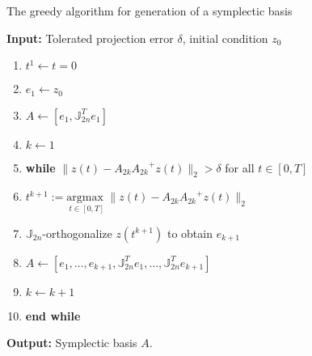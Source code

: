 \begin{algorithm} 
\caption{The greedy algorithm for generation of a symplectic basis} \label{alg:added1}
{\bf Input:} Tolerated projection error $\delta$, initial condition $ z_0$
\begin{enumerate}
\item $t^1 \leftarrow t=0$
\item $e_1 \leftarrow z_0$
\item $A \leftarrow [e_1,\mathbb J^T_{2n}e_1]$
\item $k \leftarrow 1$
\item \textbf{while} $\| z(t) - A_{2k}{A_{2k}}^+z(t) \|_2 > \delta$ for all $t \in [0,T]$
\item \hspace{0.5cm} $t^{k+1} := \underset{t\in [0,T]}{\text{argmax }} \| z(t) - A_{2k}{A_{2k}}^+z(t) \|_2$
\item \hspace{0.5cm} $\mathbb J_{2n}$-orthogonalize $ z(t^{k+1})$ to obtain $e_{k+1}$
\item \hspace{0.5cm} $A \leftarrow [e_1,\dots ,e_{k+1} , \mathbb J^T_{2n}e_1,\dots,\mathbb J^T_{2n}e_{k+1}]$
\item \hspace{0.5cm} $k \leftarrow k+1$
\item \textbf{end while}
\end{enumerate}
\vspace{0.5cm}
{\bf Output:} Symplectic basis $A$.
\end{algorithm}


